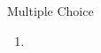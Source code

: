 \documentclass{article}
\begin{document}

\begin{exercise}{Multiple Choice}
  \begin{enumerate}
    \item
  \end{enumerate}

  \begin{solution}

  \end{solution}
\end{exercise}
\end{document}
